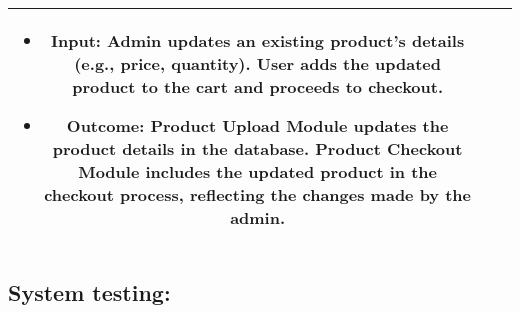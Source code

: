 \documentclass{article}
\begin{document}
\begin{table}[htbp]
\begin{tabularx}{\textwidth}{|c|X|X|}
        \begin{itemize}[leftmargin=*]
            \item Input: Admin updates an existing product's details (e.g., price, quantity). User adds the updated product to the cart and proceeds to checkout.
            \item Outcome: Product Upload Module updates the product details in the database. Product Checkout Module includes the updated product in the checkout process, reflecting the changes made by the admin.
        \end{itemize} \\
        \hline
    \end{tabularx}
\end{table}

\subsection*{System testing:}
\end{document}
